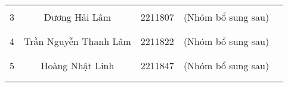 \begin{table}[H]
\begin{tabular}{|c|c|c|c|l|}
                    &                                           &                                   &                                                           &                                                                   \\ \cline{5-5} 
\multirow{-3}{*}{3} & \multirow{-3}{*}{Dương Hải Lâm}           & \multirow{-3}{*}{2211807}         & \multirow{-3}{*}{(Nhóm bổ sung sau)}                      &                                                                   \\ \hline
                    &                                           &                                   &                                                           &                                                                   \\ \cline{5-5} 
                    &                                           &                                   &                                                           &                                                                   \\ \cline{5-5} 
\multirow{-3}{*}{4} & \multirow{-3}{*}{Trần Nguyễn Thanh Lâm}   & \multirow{-3}{*}{2211822}         & \multirow{-3}{*}{(Nhóm bổ sung sau)}                      &                                                                   \\ \hline
                    &                                           &                                   &                                                           &                                                                   \\ \cline{5-5} 
                    &                                           &                                   &                                                           &                                                                   \\ \cline{5-5}  
\multirow{-3}{*}{5} & \multirow{-3}{*}{Hoàng Nhật Linh}         & \multirow{-3}{*}{2211847}         & \multirow{-3}{*}{(Nhóm bổ sung sau)}                      &                                                                   \\ \hline
                    &                                           &                                   &                                                           &                                                                   \\ \cline{5-5} 
                    &                                           &                                   &                                                           &                                                                   \\ \cline{5-5}  

\end{tabular}
\end{table}
